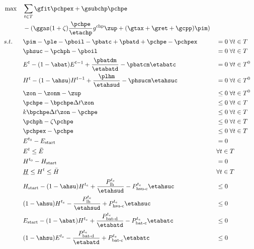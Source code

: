 \begin{align}
& \max && \sum_{t \in T} \gfit \pchpex + \gsubchp \pchpe  \\ &&& - (\ggas (1 + \zeta) \frac{\pchpe}{\etachp} g^{\text{chp}} \zup + (\gtax + \gret + \gcpp) \pim ) \\
& s.t. && \pim - \ple - \pboil - \pbatc + \pbatd + \pchpe - \pchpex &&= 0 \; \forall t \in T \label{elecbal} \\
&&& \phsuc - \pchph -\pboil &&= 0 \; \forall t \in T \label{hsuinput}\\
&&& E^t - (1-\abat) E^{t-1} + \frac{\pbatdm}{\etabatd} - \pbatcm \etabatc &&= 0 \; \forall t \in T^0 \label{batbal} \\
&&& H^t - (1-\ahsu) H^{t-1} + \frac{\plhm}{\etahsud} - \phsucm \etahsuc &&= 0 \; \forall t \in T^0 \label{hsubal} \\
&&& \zon - \zonm - \zup &&\leq 0 \; \forall t \in T^0 \label{zuplower} \\
&&& \pchpe - \bpchpe \Delta t \zon &&\leq 0 \; \forall t \in T \label{chpeupper}\\
&&& k \bpchpe \Delta t \zon - \pchpe &&\leq 0 \; \forall t \in T \label{chpelower}\\
&&& \pchph - \zeta \pchpe &&\leq 0 \; \forall t \in T \label{chphupper} \\
&&& \pchpex - \pchpe &&\leq 0 \; \forall t \in T \label{chpexupper}\\
&&& E^{t_0} - E_\text{start} &&= 0 \label{initbat}\\
&&& E^t \leq \bar E && \forall t \in T \label{Ebd}\\
&&& H^{t_0} - H_\text{start} &&= 0 \label{inithsu}\\
&&& \underline{H} \leq H^t \leq \bar H && \forall t \in T \label{Hbd}\\
&&& H_\text{start} - (1-\ahsu) H^{t_e} + \frac{P^{t_e}_{\text{lh}}}{\etahsud} - P^{t_e}_{\text{hsu-c}} \etahsuc  &&\leq 0 \label{hsutermlo}\\
&&& (1-\ahsu) H^{t_e} - \frac{P^{t_e}_{\text{lh}}}{\etahsud} + P^{t_e}_{\text{hsu-c}} \etahsuc  &&\leq 0 \label{hsutermup}\\
&&& E_\text{start} - (1-\abat) H^{t_e} + \frac{P^{t_e}_{\text{bat-d}}}{\etabatd} - P^{t_e}_{\text{bat-c}} \etabatc  &&\leq 0 \label{battermlo}\\
&&& (1-\ahsu) E^{t_e} - \frac{P^{t_e}_{\text{bat-d}}}{\etabatd} + P^{t_e}_{\text{bat-c}} \etabatc  &&\leq 0 \label{battermup} 
\end{align}

